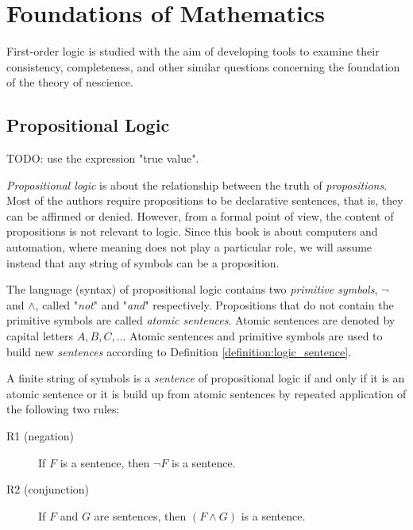 %
%


\chapter{Foundations of Mathematics}
\label{chap:foundations_mathematics}

First-order logic is studied {\color{red} with the aim of developing tools to
examine their consistency, completeness, and other similar questions concerning
the foundation} of the theory of nescience.

%
%

\section{Propositional Logic}

{\color{red} TODO: use the expression "true value".}

\emph{Propositional logic} is about the relationship between the truth of \emph{propositions}. Most of the authors require propositions to be declarative sentences, that is, they can be affirmed or denied. However, from a formal point of view, the content of propositions is not relevant to logic. Since this book is about computers and automation, where meaning does not play a particular role, we will assume instead that any string of symbols can be a proposition. 

The language (syntax) of propositional logic contains two \emph{primitive symbols}, $\lnot$ and $\land$, called "\emph{not}" and "\emph{and}" respectively. Propositions that do not contain the primitive symbols are called \emph{atomic sentences}. Atomic sentences are denoted by capital letters $A, B, C, ...$ Atomic sentences and primitive symbols are used to build new \emph{sentences} according to Definition \ref{definition:logic_sentence}.

\begin{definition}
\label{definition:logic_sentence}
A finite string of symbols is a \emph{sentence} of propositional logic if and only if it is an atomic sentence or it is build up from atomic sentences by repeated application of the following two rules:
\begin{description}
\item[R1 (negation)] If $F$ is a sentence, then $\lnot F$ is a sentence.
\item[R2 (conjunction)] If $F$ and $G$ are sentences, then $( F \land G )$ is a sentence.
\end{description}
\end{definition}

